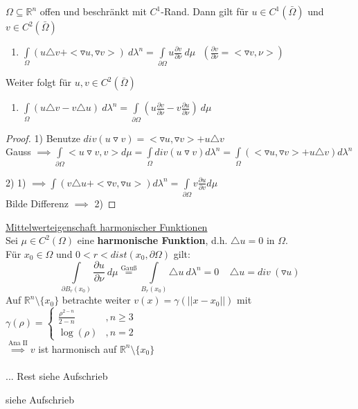\begin{lemma}
  $\Omega \subseteq \mathbb{R}^n$ offen und beschränkt mit $C^1$-Rand. Dann gilt für $u \in C^1(\bar{\Omega})$ und $v \in C^2(\bar{\Omega})$
  \begin{enumerate}
    \item $\int\limits_{\Omega}(u \triangle v + <\triangledown u, \triangledown v>) \ d\lambda^n = \int\limits_{\partial \Omega} u \frac{\partial v}{\partial \nu} \ d\mu \ \ \ (\frac{\partial v}{\partial \nu} = <\triangledown v, \nu>)$
  \end{enumerate}
  Weiter folgt für $u,v \in C^2(\bar{\Omega})$
  \begin{enumerate}[resume]
    \item $\int\limits_{\Omega} (u \triangle v - v \triangle u) \ d\lambda^n = \int\limits_{\partial \Omega}(u \frac{\partial v}{\partial \nu} - v \frac{\partial u}{\partial \nu}) \ d\mu$
  \end{enumerate}
\end{lemma}

\begin{proof}
  \item[1)] Benutze $div(u\triangledown v) = <\triangledown u, \triangledown v> + u \triangle v$ \\
  Gauss $\implies \int\limits_{\partial\Omega} <u\triangledown v,v> d\mu = \int\limits_\Omega div(u \triangledown v) d\lambda^n = \int\limits_\Omega (<\triangledown u, \triangledown v> + u \triangle v) d\lambda^n$
  \item[2)] 1) $\implies \int (v\triangle u + <\triangledown v, \triangledown u>) d\lambda^n = \int\limits_{\partial\Omega} v \frac{\partial u}{\partial v} d\mu$ \\
  Bilde Differenz $\implies$ 2)
\end{proof}

\begin{example}
  \underline{Mittelwerteigenschaft harmonischer Funktionen}\\
  Sei $\mu \in C^2(\Omega)$ eine \textbf{harmonische Funktion}, d.h. $\triangle u = 0$ in $\Omega$.\\
  Für $x_0 \in \Omega$ und $0<r<dist(x_0, \partial \Omega)$ gilt:
  $$\int\limits_{\partial B_r(x_0)} \frac{\partial u}{\partial \nu} \ d\mu \stackrel{\text{Gauß}}{=} \int\limits_{B_r(x_0)} \triangle u \ d\lambda^n = 0 \ \ \ \ \ \triangle u = div \ (\triangledown u)$$
  Auf $\mathbb{R}^n\setminus\{x_0\}$ betrachte weiter $v(x) = \gamma(||x-x_0||)$ mit $\gamma(\rho) = \begin{cases}
    \frac{\rho^{2-n}}{2-n} & , n\geq 3\\
    \log(\rho) & , n = 2
  \end{cases}$\\
  $\stackrel{\text{Ana II}}{\implies} v$ ist harmonisch auf $\mathbb{R}^n\setminus\{x_0\}$\\
  \\
  ... Rest siehe Aufschrieb
\end{example}

\begin{example}
  siehe Aufschrieb
\end{example}